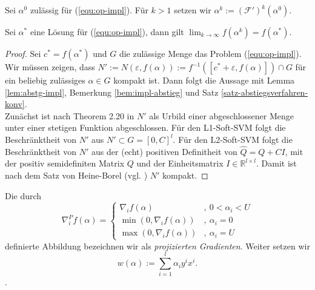 Sei $\alpha^0$ zulässig für (\ref{equ:op-impl}). Für $k > 1$ setzen wir $\alpha^k := (\mathcal{F}')^k(\alpha^0)$. 

\begin{satz}\label{satz:impl-grenz-opt}
	Sei $\alpha^*$ eine Lösung für (\ref{equ:op-impl}), dann gilt $\lim_{k \rightarrow \infty} f(\alpha^k) = f(\alpha^*)$.
\end{satz}
\begin{proof}
	Sei $c^* = f(\alpha^*)$ und $G$ die zulässige Menge das Problem (\ref{equ:op-impl}). 
	Wir müssen zeigen, dass $N' := N(\varepsilon,f(\alpha)) := f^{-1}([c^*+\varepsilon, f(\alpha)]) \cap G$ für ein beliebig zulässiges $\alpha \in G$ kompakt ist. Dann folgt die Aussage mit Lemma \ref{lem:abstg-impl}, Bemerkung \ref{bem:impl-abstieg} und Satz \ref{satz-abstiegsverfahren-konv}. \\ 
	
	Zunächst ist nach Theorem 2.20 in \cite{ae-ana1} $N'$ als Urbild einer abgeschlossener Menge unter einer stetigen Funktion abgeschlossen. 
	Für den L1-Soft-SVM folgt die Beschränktheit von $N'$ aus $N' \subset G = [0,C]^l$. Für den L2-Soft-SVM folgt die Beschränktheit von $N'$ aus der (echt) positiven Definitheit von $\hat{Q} = Q + CI$, mit der positiv semidefiniten Matrix $Q$ und der Einheitsmatrix $I \in \mathbb{R}^{l \times l}$. Damit ist nach dem Satz von Heine-Borel (vgl. \cite{ae-ana1}) $N'$ kompakt.
\end{proof}


\begin{definition} 
Die durch 
$$
\nabla_i^P f(\alpha) = \left\{ 
\begin{array}{ll}
	\nabla_i f(\alpha)  		 &,\ 0 < \alpha_i < U \\
	\min(0, \nabla_i f(\alpha))	 &,\ \alpha_i = 0 \\
	\max(0, \nabla_i f(\alpha))  &,\ \alpha_i = U
\end{array}
\right.
$$
definierte Abbildung bezeichnen wir als \emph{projizierten Gradienten}. Weiter setzen wir  
$$ 
	w(\alpha) := \sum_{i=1}^{l} \alpha_i y^i x^i.
$$.
\end{definition}


